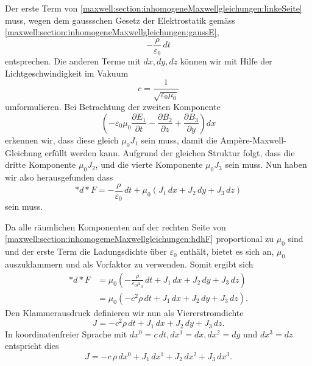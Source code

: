Der erste Term von \eqref{maxwell:section:inhomogeneMaxwellgleichungen:linkeSeite} muss, wegen dem gaussschen Gesetz der Elektrostatik gemäss \eqref{maxwell:section:inhomogeneMaxwellgleichungen:gaussE}, 
\begin{equation*}
	-\frac{\rho}{\varepsilon_0} \,dt
\end{equation*}
entsprechen.
Die anderen Terme mit $dx,dy,dz$ können wir mit Hilfe der Lichtgeschwindigkeit im Vakuum 
\begin{equation*}
	c = \frac{1}{\sqrt{\varepsilon_0 \mu_0}}
\end{equation*}
umformulieren.
Bei Betrachtung der zweiten Komponente
\begin{equation*}
	\left(-\varepsilon_0 \mu_0 \frac{\partial E_1}{\partial t} - \frac{\partial B_2}{\partial z} + \frac{\partial B_3}{\partial y}\right)dx
\end{equation*}
erkennen wir, dass diese gleich $\mu_0 J_1$ sein muss, damit die Ampère-Maxwell-Gleichung erfüllt werden kann.
Aufgrund der gleichen Struktur folgt, dass die dritte Komponente $\mu_0 J_2$, und die vierte Komponente $\mu_0 J_3$ sein muss.
Nun haben wir also herausgefunden dass
\begin{equation}
	\ast d {\ast} F = -\frac{\rho}{\varepsilon_0}\,dt + \mu_0 (J_1 \,dx +  J_2 \,dy +  J_3 \,dz)
	\label{maxwell:section:inhomogemeMaxwellgleichungen:hdhF}
\end{equation}
sein muss.

Da alle räumlichen Komponenten auf der rechten Seite von \eqref{maxwell:section:inhomogemeMaxwellgleichungen:hdhF} proportional zu $\mu_0$ sind und der erste Term die Ladungsdichte über $\varepsilon_0$ enthält, bietet es sich an, $\mu_0$ auszuklammern und als Vorfaktor zu verwenden.
Somit ergibt sich
\begin{align*}
	\ast d {\ast} F
	& = \mu_0 \left( -\frac{\rho}{\varepsilon_0 \mu_0}\,dt + J_1\, dx + J_2\, dy + J_3\, dz \right)\\[2ex]
	& = \mu_0 \left( -c^2 \rho \,dt + J_1 \,dx + J_2 \,dy + J_3 \,dz \right).
\end{align*}
Den Klammerausdruck definieren wir nun als Viererstromdichte
\begin{equation}
	J = -c^2 \rho\, dt + J_1 \,dx + J_2 \,dy + J_3 \,dz.
\end{equation}
In koordinatenfreier Sprache mit $dx^0 = c\,dt, dx^1 = dx,dx^2=dy$ und $dx^3 = dz$ entspricht dies
\begin{equation}
	J = -c\,\rho\,dx^0 + J_1 \,dx^1 + J_2 \,dx^2 + J_3 \,dx^3.
\end{equation}

